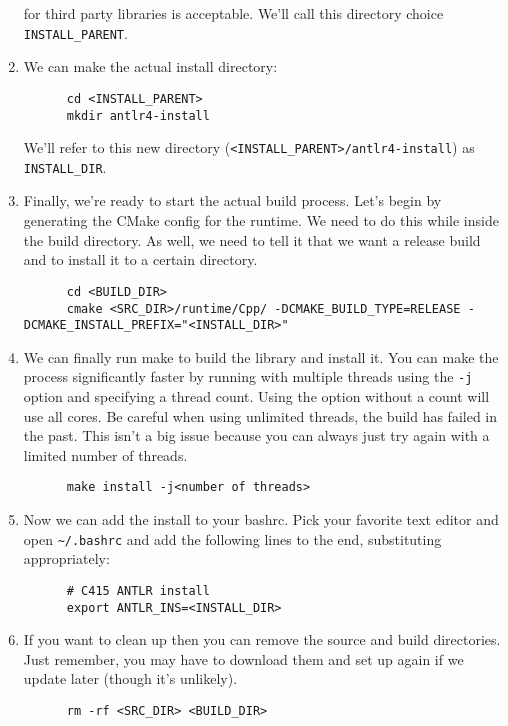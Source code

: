 \documentclass[../setup.tex]{subfiles}
\begin{document}
\begin{enumerate}
    for third party libraries is acceptable. We'll call this directory choice
    \lstinline{INSTALL_PARENT}.
  \item
    We can make the actual install directory:
    \begin{lstlisting}
      cd <INSTALL_PARENT>
      mkdir antlr4-install
    \end{lstlisting}
    We'll refer to this new directory (\lstinline{<INSTALL_PARENT>/antlr4-install}) as
    \lstinline{INSTALL_DIR}.
  \item
    Finally, we're ready to start the actual build process. Let's begin by generating the CMake
    config for the runtime. We need to do this while inside the build directory. As well, we need
    to tell it that we want a release build and to install it to a certain directory.
    \begin{lstlisting}
      cd <BUILD_DIR>
      cmake <SRC_DIR>/runtime/Cpp/ -DCMAKE_BUILD_TYPE=RELEASE -DCMAKE_INSTALL_PREFIX="<INSTALL_DIR>"
    \end{lstlisting}
  \item
    We can finally run make to build the library and install it. You can make the process
    significantly faster by running with multiple threads using the \lstinline{-j} option and
    specifying a thread count. Using the option without a count will use all cores. Be careful when
    using unlimited threads, the build has failed in the past. This isn't a big issue because you
    can always just try again with a limited number of threads.
    \begin{lstlisting}
      make install -j<number of threads>
    \end{lstlisting}
  \item
    Now we can add the install to your bashrc. Pick your favorite text editor and open
    \lstinline{~/.bashrc} and add the following lines to the end, substituting appropriately:
    \begin{lstlisting}
      # C415 ANTLR install
      export ANTLR_INS=<INSTALL_DIR>
    \end{lstlisting}
  \item
    If you want to clean up then you can remove the source and build directories. Just remember,
    you may have to download them and set up again if we update later (though it's unlikely).
    \begin{lstlisting}
      rm -rf <SRC_DIR> <BUILD_DIR>
    \end{lstlisting}
\end{enumerate}
\end{document}
